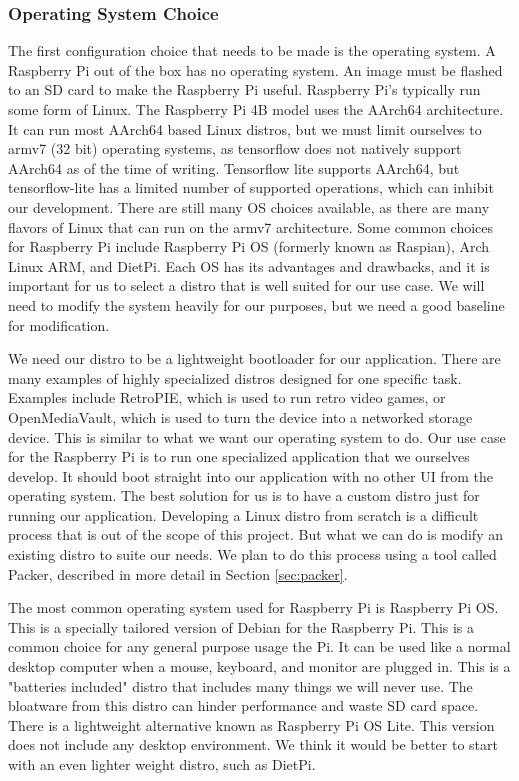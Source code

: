 \subsubsection{Operating System Choice}

The first configuration choice that needs to be made is the operating system. A Raspberry
Pi out of the box has no operating system. An image must be flashed to an SD card to make
the Raspberry Pi useful. Raspberry Pi's typically run some form of Linux. The Raspberry Pi
4B model uses the AArch64 architecture. It can run most AArch64 based Linux distros, but
we must limit ourselves to armv7 (32 bit) operating systems, as tensorflow does not
natively support AArch64 as of the time of writing. Tensorflow lite supports AArch64, but
tensorflow-lite has a limited number of supported operations, which can inhibit our
development. There are still many OS choices available, as there are many flavors of Linux
that can run on the armv7 architecture. Some common choices for Raspberry Pi include
Raspberry Pi OS (formerly known as Raspian), Arch Linux ARM, and DietPi. Each OS has its
advantages and drawbacks, and it is important for us to select a distro that is well
suited for our use case. We will need to modify the system heavily for our purposes, but
we need a good baseline for modification.

We need our distro to be a lightweight bootloader for our application. There are many
examples of highly specialized distros designed for one specific task. Examples
include RetroPIE, which is used to run retro video games, or OpenMediaVault, which is used
to turn the device into a networked storage device. This is similar to what we want our
operating system to do. Our use case for the Raspberry Pi is to run one specialized
application that we ourselves develop. It should boot straight into our application with
no other UI from the operating system. The best solution for us is to have a custom distro
just for running our application. Developing a Linux distro from scratch is a difficult
process that is out of the scope of this project. But what we can do is modify an existing
distro to suite our needs. We plan to do this process using a tool called Packer,
described in more detail in Section \ref{sec:packer}.

The most common operating system used for Raspberry Pi is Raspberry Pi OS. This is a
specially tailored version of Debian for the Raspberry Pi. This is a common choice for any
general purpose usage the Pi. It can be used like a normal desktop computer when a mouse,
keyboard, and monitor are plugged in. This is a "batteries included" distro that includes
many things we will never use. The bloatware from this distro can hinder performance and
waste SD card space. There is a lightweight alternative known as Raspberry Pi OS Lite.
This version does not include any desktop environment. We think it would be better to
start with an even lighter weight distro, such as DietPi.

